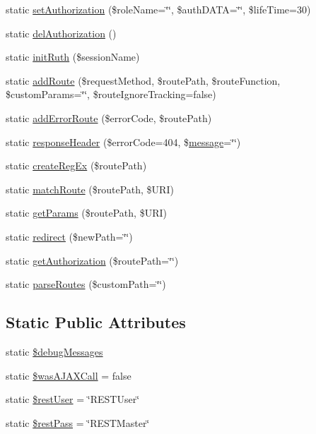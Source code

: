 \begin{DoxyCompactItemize}
\item 
static \hyperlink{classRuth_a2cbe3cd7c0d3dfadac54a6020d075607}{set\+Authorization} (\$role\+Name=\char`\"{}\char`\"{}, \$auth\+D\+A\+T\+A=\char`\"{}\char`\"{}, \$life\+Time=30)
\item 
static \hyperlink{classRuth_af751cee7c3766c478a09ea14ffc5ce99}{del\+Authorization} ()
\item 
static \hyperlink{classRuth_a2ce840061c470dee079816ec54bfc1f4}{init\+Ruth} (\$session\+Name)
\item 
static \hyperlink{classRuth_ad13bc87f60f8b74efd4c784fa2c49288}{add\+Route} (\$request\+Method, \$route\+Path, \$route\+Function, \$custom\+Params=\char`\"{}\char`\"{}, \$route\+Ignore\+Tracking=false)
\item 
static \hyperlink{classRuth_a824d3cd236fd20d3f8cdc1865b8a3605}{add\+Error\+Route} (\$error\+Code, \$route\+Path)
\item 
static \hyperlink{classRuth_aba8f6d2223ff063fc5d0133d6f85f2c0}{response\+Header} (\$error\+Code=404, \$\hyperlink{Tessa_8php_a37ab31c170417027f819bfc053d7cd39}{message}=\char`\"{}\char`\"{})
\item 
static \hyperlink{classRuth_af382f8396d9d15c9d289b1024a974360}{create\+Reg\+Ex} (\$route\+Path)
\item 
static \hyperlink{classRuth_a4cc98adb973c4d46742b05a02ecb6ee3}{match\+Route} (\$route\+Path, \$U\+R\+I)
\item 
static \hyperlink{classRuth_aa8c09285cc5f2a214b8fbe5e45e88cea}{get\+Params} (\$route\+Path, \$U\+R\+I)
\item 
static \hyperlink{classRuth_a99efe91394d300de83f7124acea0b595}{redirect} (\$new\+Path=\char`\"{}\char`\"{})
\item 
static \hyperlink{classRuth_aa9bd38599bb5bd892ddf856c1687b04a}{get\+Authorization} (\$route\+Path=\char`\"{}\char`\"{})
\item 
static \hyperlink{classRuth_a0fbc42c3af4f62e230b4c3208ce9451c}{parse\+Routes} (\$custom\+Path=\char`\"{}\char`\"{})
\end{DoxyCompactItemize}
\subsection*{Static Public Attributes}
\begin{DoxyCompactItemize}
\item 
static \hyperlink{classRuth_abcc2411c11abe0c3675069f255db1f97}{\$debug\+Messages}
\item 
static \hyperlink{classRuth_aaaf0e436f08cbd148c492584832da4cc}{\$was\+A\+J\+A\+X\+Call} = false
\item 
static \hyperlink{classRuth_abe139defb62f176c0a077983561f9d86}{\$rest\+User} = \char`\"{}R\+E\+S\+T\+User\char`\"{}
\item 
static \hyperlink{classRuth_ab4e553a88d7384c2dd07158efe3dd933}{\$rest\+Pass} = \char`\"{}R\+E\+S\+T\+Master\char`\"{}
\end{DoxyCompactItemize}


